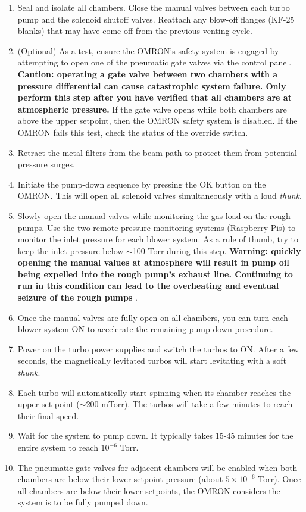\begin{enumerate}
	\item Seal and isolate all chambers. Close the manual valves between each turbo pump and the solenoid shutoff valves. Reattach any blow-off flanges (KF-25 blanks) that may have come off from the previous venting cycle.
	\item (Optional) As a test, ensure the OMRON's safety system is engaged by attempting to open one of the pneumatic gate valves via the control panel. \textbf{Caution: operating a gate valve between two chambers with a pressure differential can cause catastrophic system failure. Only perform this step after you have verified that all chambers are at atmospheric pressure.} If the gate valve opens while both chambers are above the upper setpoint, then the OMRON safety system is disabled. If the OMRON fails this test, check the status of the override switch.
	\item Retract the metal filters from the beam path to protect them from potential pressure surges. 
	\item Initiate the pump-down sequence by pressing the OK button on the OMRON. This will open all solenoid valves simultaneously with a loud \textit{thunk}.
	\item Slowly open the manual valves while monitoring the gas load on the rough pumps. Use the two remote pressure monitoring systems (Raspberry Pis) to monitor the inlet pressure for each blower system. As a rule of thumb, try to keep the inlet pressure below $\sim$100 Torr during this step. \textbf{Warning: quickly opening the manual values at atmosphere will result in pump oil being expelled into the rough pump's exhaust line. Continuing to run in this condition can lead to the overheating and eventual seizure of the rough pumps} \cite{kiesewetterDynamicsNearThresholdAttosecond2019}.
	\item Once the manual valves are fully open on all chambers, you can turn each blower system ON to accelerate the remaining pump-down procedure.
	\item Power on the turbo power supplies and switch the turbos to ON. After a few seconds, the magnetically levitated turbos will start levitating with a soft \textit{thunk}.
	\item Each turbo will automatically start spinning when its chamber reaches the upper set point ($\sim$200 mTorr). The turbos will take a few minutes to reach their final speed.
	\item Wait for the system to pump down. It typically takes 15-45 minutes for the entire system to reach $10^{-6}$ Torr.
	\item The pneumatic gate valves for adjacent chambers will be enabled when both chambers are below their lower setpoint pressure (about $5 \times 10^{-6}$ Torr). Once all chambers are below their lower setpoints, the OMRON considers the system is to be fully pumped down.
\end{enumerate}

